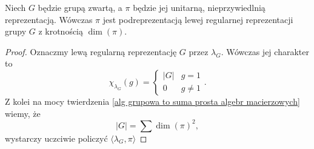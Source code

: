 \begin{theorem}{}{}
  Niech $G$ będzie grupą zwartą, a $\pi$ będzie jej unitarną, nieprzywiedlnią reprezentacją. Wówczas $\pi$ jest podreprezentacją lewej regularnej reprezentacji grupy $G$ z krotnością $\dim(\pi)$.
\end{theorem}

\begin{proof}
  Oznaczmy lewą regularną reprezentację $G$ przez $\lambda_G$. Wówczas jej charakter to
  $$\chi_{\lambda_G}(g)=\begin{cases}|G| & g=1\\ 0 & g\neq 1\end{cases}.$$
  Z kolei na mocy twierdzenia \ref{alg grupowa to suma prosta algebr macierzowych} wiemy, że 
  $$|G|=\sum\dim(\pi)^2,$$
  {\color{red}wystarczy uczciwie policzyć $\langle \lambda_G, \pi\rangle$}
\end{proof}





